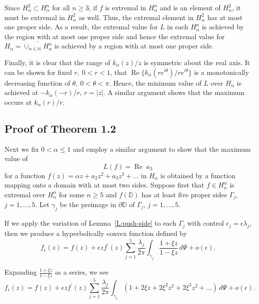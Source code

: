 \documentclass{cmft}
\newcommand{\dsp}{\displaystyle}
\newcommand{\N}{\mathbb{N}}
\newcommand{\D}{\mathbb{D}}
\newcommand{\al}{\alpha}
\DeclareMathOperator{\re}{Re}
\begin{document}
Since $H_{\al}^2 \subset H_{\al}^n$ for all $n \geq 3$, if $f$ is extremal in
$H_{\al}^n$ and is an element of $H_{\al}^2$, it must be extremal in $H_{\al}^2$
as well.  Thus, the extremal element in $H_{\al}^2$ has at most one proper side.
As a result,
the extremal value for $L$ in each $H_{\al}^n$ is achieved by the region
with at most one proper side and hence the extremal value for $\dsp{H_{\al} =
\overline{ \cup_{n\in \N} H_{\al}^n}}$ is achieved by a region with at most one
proper side.

Finally, it is clear that the range of $k_{\al}(z)/z$ is symmetric about the real
axis.  It can be shown for fixed $r, \ 0 < r < 1$, that $\re \{k_{\al}(re^{i
\theta})/re^{i \theta} \}$ is a monotonically decreasing function of $\theta, \ 0
< \theta < \pi$.  Hence, the minimum value of $L$ over
$H_{\al}$ is achieved at $-k_{\al}(-r)/r$, $r=|z|$.
A similar argument shows that the maximum occurs at $k_\al(r)/r$.




\subsection{Proof of Theorem 1.2}

Next we fix $0<\al\leq 1$ and employ a similar argument to show that the 
maximum value
of 
\[
L(f)=\re \;a_3
\]
 for a function $f(z)=\al z+a_2 z^2+a_3 z^3+\dots$ in $H_\al$
is obtained by a function mapping onto a domain with at most two sides.
Suppose first that $f\in H_n^\al$ is extremal over $H_n^\al$ for some
$n\ge 5$ and $f(\D)$ has at least five proper sides $\Gamma_j$, 
$j=1,\dots, 5$.
Let $\gamma_j$ be the preimage in $\partial \D$ of $\Gamma_j$, $j=1,\dots, 5$.

If we apply the variation of Lemma~\ref{L:push-side} to each $\Gamma_j$ with
control $\epsilon_j=\epsilon \lambda_j$, then we produce a hyperbolically
convex function defined by
\[
f_\epsilon(z)=f(z) + \epsilon z f^\prime(z) 
\sum_{j=1}^5 \frac{\lambda_j}{2\pi} 
\int_{\gamma_j} \frac{1 +\xi z}{1- \xi z} \,d\Psi + o(\epsilon).
\] 

  Expanding $\frac{1+\xi z}{1-\xi z}$ as a 
series, we see
\[
f_\epsilon(z)= f(z) + \epsilon z f^\prime(z) \sum_{j=1}^5 \frac{\lambda_j}{2\pi} 
\int_{\gamma_j} (1+2 \xi z+2 \xi^2 z^2 +2 \xi^3 z^2 +\dots)\, d\Psi+o(\epsilon).
\]
\end{document}
